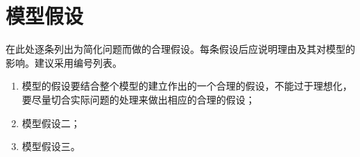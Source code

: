 \section{模型假设}

在此处逐条列出为简化问题而做的合理假设。每条假设后应说明理由及其对模型的影响。建议采用编号列表。

\begin{enumerate}
  \item 模型的假设要结合整个模型的建立作出的一个合理的假设，不能过于理想化，要尽量切合实际问题的处理来做出相应的合理的假设；
  \item 模型假设二；
  \item 模型假设三。
\end{enumerate}
